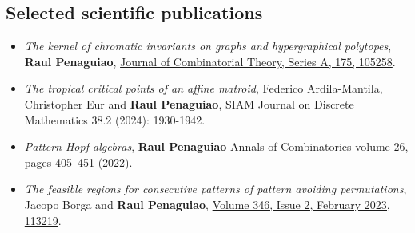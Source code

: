 \documentclass[margin, 10pt]{res} %
\begin{document}
\begin{resume}
\section{Selected scientific publications}


\begin{itemize}
\item {\sl The kernel of chromatic invariants on graphs and hypergraphical polytopes}, \textbf{Raul Penaguiao}, \href{https://www.sciencedirect.com/}{Journal of Combinatorial Theory, Series A, 175, 105258}.

\item {\sl  The tropical critical points of an affine matroid}, Federico Ardila-Mantila, Christopher Eur and \textbf{Raul Penaguiao}, SIAM Journal on Discrete Mathematics 38.2 (2024): 1930-1942.

\item {\sl Pattern Hopf algebras}, \textbf{Raul Penaguiao} \href{https://link.springer.com/article/10.1007/s00026-022-00578-3}{Annals of Combinatorics volume 26, pages 405–451 (2022)}.

\item {\sl The feasible regions for consecutive patterns of pattern avoiding permutations}, Jacopo Borga and \textbf{Raul Penaguiao}, \href{https://doi.org/10.1016/j.disc.2022.113219}{Volume 346, Issue 2, February 2023, 113219}.


%







\end{itemize}
\end{resume}
\end{document}
